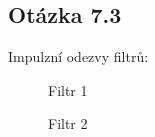 \documentclass[a4paper,12pt]{article}
\begin{document}
\subsection{Otázka 7.3}
Impulzní odezvy filtrů:
\begin{figure}[h!]
\centering
\begin{minipage}{0.48\textwidth}
\caption{Filtr 1}
\end{minipage}
\hfill 
\begin{minipage}{0.48\textwidth}
\caption{Filtr 2}
\end{minipage}
\end{figure}
\end{document}
